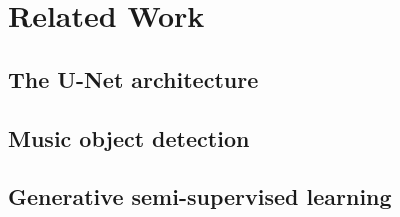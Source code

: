 \chapter{Related Work}
\label{chap:RelatedWork}

\section{The U-Net architecture}



\section{Music object detection}



\section{Generative semi-supervised learning}

